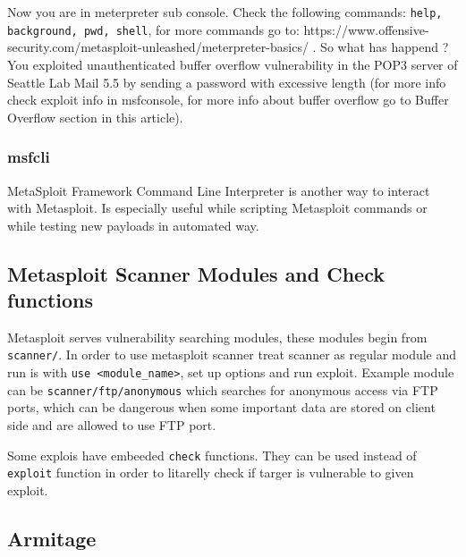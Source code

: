 \documentclass{article}[12pt]
\begin{document}
Now you are in meterpreter sub console. Check the following commands: \texttt{help, background, pwd, shell}, for more commands go to: https://www.offensive-security.com/metasploit-unleashed/meterpreter-basics/ .
So what has happend ? You exploited unauthenticated buffer overflow vulnerability in the POP3 server of Seattle Lab Mail 5.5 by sending a password with excessive length (for more info check exploit info in msfconsole, for more info about buffer overflow go to Buffer Overflow section in this article).

\subsubsection{msfcli}
MetaSploit Framework Command Line Interpreter is another way to interact with Metasploit. Is especially useful while scripting Metasploit commands or while testing new payloads in automated way.


\subsection{Metasploit Scanner Modules and Check functions}

Metasploit serves vulnerability searching modules, these modules begin from \texttt{scanner/}. In order to use metasploit scanner treat scanner as regular module and run is with \texttt{use <module\_name>}, set up options and run exploit. Example module can be \texttt{scanner/ftp/anonymous} which searches for anonymous access via FTP ports, which can be dangerous when some important data
are stored on client side and are allowed to use FTP port.

Some explois have embeeded \texttt{check} functions. They can be used instead of \texttt{exploit} function in order to litarelly check if targer is vulnerable to given exploit.


\subsection{Armitage}
\end{document}
